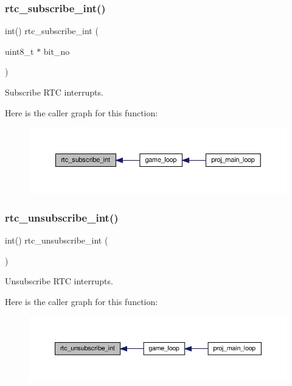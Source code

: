 \subsubsection{\texorpdfstring{rtc\+\_\+subscribe\+\_\+int()}{rtc\_subscribe\_int()}}
{\footnotesize\ttfamily int() rtc\+\_\+subscribe\+\_\+int (\begin{DoxyParamCaption}\item[{uint8\+\_\+t $\ast$}]{bit\+\_\+no }\end{DoxyParamCaption})}



Subscribe R\+TC interrupts. 

Here is the caller graph for this function\+:
\nopagebreak
\begin{figure}[H]
\begin{center}
\leavevmode
\includegraphics[width=350pt]{group__rtc_ga6bbe679f115cec90d36d50eb2aac1b89_icgraph}
\end{center}
\end{figure}
\mbox{\label{group__rtc_ga9d4850bb2a488644672d43287f160622}} 
\subsubsection{\texorpdfstring{rtc\+\_\+unsubscribe\+\_\+int()}{rtc\_unsubscribe\_int()}}
{\footnotesize\ttfamily int() rtc\+\_\+unsubscribe\+\_\+int (\begin{DoxyParamCaption}{ }\end{DoxyParamCaption})}



Unsubscribe R\+TC interrupts. 

Here is the caller graph for this function\+:
\nopagebreak
\begin{figure}[H]
\begin{center}
\leavevmode
\includegraphics[width=350pt]{group__rtc_ga9d4850bb2a488644672d43287f160622_icgraph}
\end{center}
\end{figure}
\mbox{\label{group__rtc_ga48e4065b3387c3e8c78a1e114c73554e}} 
